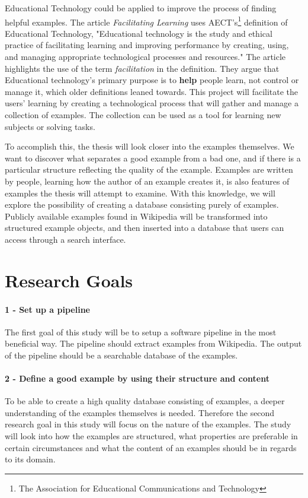Educational Technology could be applied to improve the process of finding helpful examples. The article \textit{Facilitating Learning} \cite{e-learning} uses AECT's\footnote{The Association for Educational Communications and Technology} definition of Educational Technology, "Educational technology is the study and ethical practice of facilitating learning and improving performance by creating, using, and managing appropriate technological processes and resources." The article highlights the use of the term \textit{facilitation} in the definition. They argue that Educational technology's primary purpose is to \textbf{help} people learn, not control or manage it, which older definitions leaned towards. This project will facilitate the users' learning by creating a technological process that will gather and manage a collection of examples. The collection can be used as a tool for learning new subjects or solving tasks.

To accomplish this, the thesis will look closer into the examples themselves. We want to discover what separates a good example from a bad one, and if there is a particular structure reflecting the quality of the example. Examples are written by people, learning how the author of an example creates it, is also features of examples the thesis will attempt to examine. With this knowledge, we will explore the possibility of creating a database consisting purely of examples. Publicly available examples found in Wikipedia will be transformed into structured example objects, and then inserted into a database that users can access through a search interface. 



\section{Research Goals}


\paragraph{1 - Set up a pipeline}
The first goal of this study will be to setup a software pipeline in the most beneficial way. The pipeline should extract examples from Wikipedia. The output of the pipeline should be a searchable database of the examples.

\paragraph{2 - Define a good example by using their structure and content}
To be able to create a high quality database consisting of examples, a deeper understanding of the examples themselves is needed. Therefore the second research goal in this study will focus on the nature of the examples. The study will look into how the examples are structured, what properties are preferable in certain circumstances and what the content of an examples should be in regards to its domain. 

